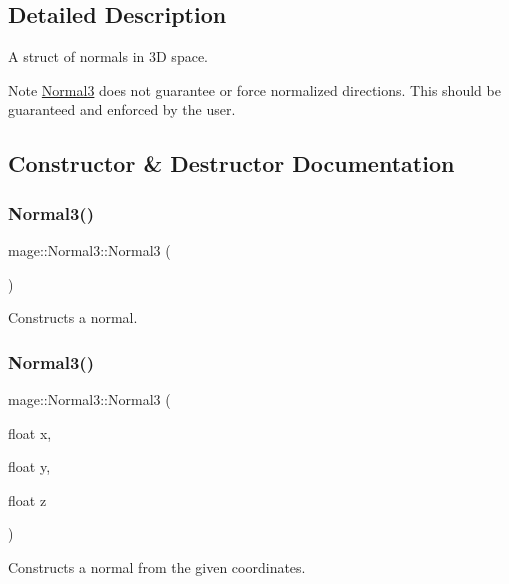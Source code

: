 \subsection{Detailed Description}
A struct of normals in 3D space.

\begin{DoxyNote}{Note}
{\ttfamily \hyperlink{structmage_1_1_normal3}{Normal3}} does not guarantee or force normalized directions. This should be guaranteed and enforced by the user. 
\end{DoxyNote}


\subsection{Constructor \& Destructor Documentation}
\hypertarget{structmage_1_1_normal3_a66ec99f0de4f8231f747e37a4da65cc4}{}\label{structmage_1_1_normal3_a66ec99f0de4f8231f747e37a4da65cc4} 
\subsubsection{\texorpdfstring{Normal3()}{Normal3()}\hspace{0.1cm}{\footnotesize\ttfamily [1/8]}}
{\footnotesize\ttfamily mage\+::\+Normal3\+::\+Normal3 (\begin{DoxyParamCaption}{ }\end{DoxyParamCaption})}

Constructs a normal. \hypertarget{structmage_1_1_normal3_a59094c1f96a9721cd8846c5c6ec06f93}{}\label{structmage_1_1_normal3_a59094c1f96a9721cd8846c5c6ec06f93} 
\subsubsection{\texorpdfstring{Normal3()}{Normal3()}\hspace{0.1cm}{\footnotesize\ttfamily [2/8]}}
{\footnotesize\ttfamily mage\+::\+Normal3\+::\+Normal3 (\begin{DoxyParamCaption}\item[{float}]{x,  }\item[{float}]{y,  }\item[{float}]{z }\end{DoxyParamCaption})}

Constructs a normal from the given coordinates.


